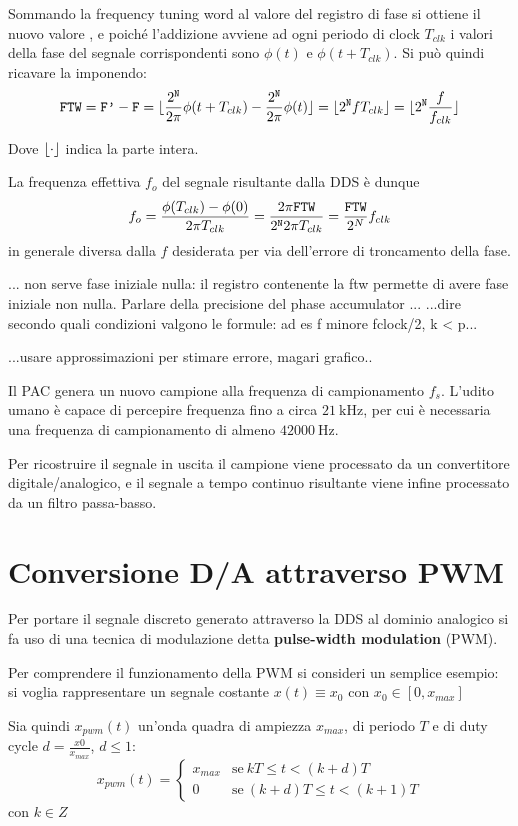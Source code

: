 Sommando la frequency tuning word al valore del registro di fase  si ottiene il nuovo valore ,
e poiché l'addizione avviene ad ogni periodo di clock $T_{clk}$ i valori della fase del segnale corrispondenti sono
$\phi(t)$ e $\phi(t + T_{clk})$.
Si può quindi ricavare la  imponendo:
\[
\texttt{FTW} = \texttt{F'} - \texttt{F} = 
\lfloor\frac{2^{\texttt{N}}}{2\pi}\phi(t+T_{clk}) - \frac{2^{\texttt{N}}}{2\pi}\phi(t)\rfloor
= \lfloor2^{\texttt{N}} f T_{clk}\rfloor = \lfloor2^{\texttt{N}} \frac{f}{f_{clk}}\rfloor
\]

Dove $\lfloor\cdot\rfloor$ indica la parte intera.

La frequenza effettiva $f_{o}$ del segnale risultante dalla DDS è dunque
\[
f_{o} = \frac{\phi(T_{clk}) - \phi(0)}{2\pi T_{clk}} = \frac{2\pi \texttt{FTW}}{2^{\texttt{N}} 2 \pi T_{clk}} = \frac{\texttt{FTW}}{2^N} f_{clk}
\]
in generale diversa dalla $f$ desiderata per via dell'errore di troncamento della fase.

... non serve fase iniziale nulla: il registro contenente la ftw permette
di avere fase iniziale non nulla. Parlare della precisione del 
phase accumulator ...
...dire secondo quali condizioni valgono le formule: ad es f minore fclock/2, k < p...

...usare approssimazioni per stimare errore, magari grafico..

Il PAC genera un nuovo campione alla frequenza di campionamento $f_s$.
L'udito umano è capace di percepire frequenza fino a circa $\SI{21}{\kilo\hertz}$, per cui è necessaria una frequenza di campionamento di almeno $\SI{42000}{\hertz}$.

Per ricostruire il segnale in uscita il campione viene processato da un convertitore digitale/analogico, e il segnale a tempo continuo risultante viene infine processato da un filtro passa-basso.

\section{Conversione D/A attraverso PWM}
Per portare il segnale discreto generato attraverso la DDS al dominio analogico si fa uso di una tecnica di modulazione detta \textbf{pulse-width modulation} (PWM).

Per comprendere il funzionamento della PWM si consideri un semplice esempio: si voglia rappresentare un segnale costante $x(t) \equiv x_0$ con $x_0 \in [0, x_{max}]$

Sia quindi $x_{pwm}(t)$ un'onda quadra di ampiezza $x_{max}$, di periodo $T$ e di duty cycle $d=\frac{x0}{x_{max}}$, $d \le 1$:
\[
x_{pwm}(t) = \begin{cases}
	x_{max} & \text{se}\ kT \le t < (k+d)T \\
	0 & \text{se}\ (k+d)T \le t < (k+1)T
\end{cases}
\] 
con $k \in Z$

